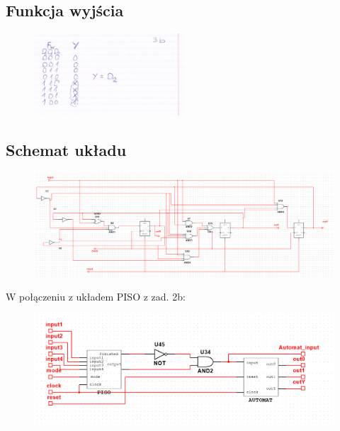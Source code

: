 \documentclass{article}
\begin{document}
\subsection{Funkcja wyjścia}
\begin{figure}[H]
\includegraphics[width = 0.5\textwidth]{3b_wyjscia}
\end{figure}
\subsection{Schemat układu}
\begin{figure}[H]
\includegraphics[width = \textwidth]{3b_uklad}
\end{figure}
W połączeniu z układem PISO z zad. 2b:
\begin{figure}[H]
\includegraphics[width = \textwidth]{3b_uklad_z_2b_blackbox}
\end{figure}
\end{document}
